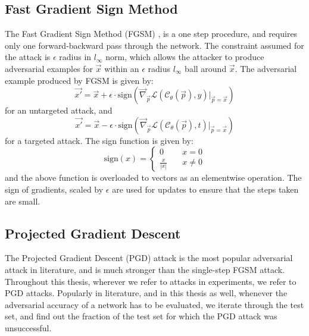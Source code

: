 \documentclass{ociamthesis}
\begin{document}
\subsection{Fast Gradient Sign Method}
The Fast Gradient Sign Method (FGSM) \citep{Goodfellow2015ExplainingAH}, is a
one step procedure, and requires only one forward-backward pass through the
network. The constraint assumed for the attack is $\epsilon$ radius in
$l_\infty$ norm, which allows the attacker to produce adversarial examples for
$\vec{x}$ within an $\epsilon$ radius $l_\infty$ ball around $\vec{x}$. The
adversarial example produced by FGSM is given by:
\begin{equation*}
    \vec{x'}
    = \vec{x} + \epsilon \cdot
    \text{sign}(\vec{\nabla}_\vec{p} \mathcal{L}(\mathcal{C}_\theta (\vec{p}), y)
    \bigr \rvert_{\vec{p}=\vec{x}})
\end{equation*}
for an untargeted attack, and
\begin{equation*}
    \vec{x'}
    = \vec{x} - \epsilon \cdot
    \text{sign}(\vec{\nabla}_\vec{p} \mathcal{L}(\mathcal{C}_\theta (\vec{p}), t)
    \bigr \rvert_{\vec{p}=\vec{x}})
\end{equation*}
for a targeted attack. The sign function is given by:
\begin{equation*}
    \text{sign}(x) = 
    \left\{
        \begin{array}{ll}
            0 & \quad x = 0 \\
            \frac{x}{|x|} & \quad x \neq 0
        \end{array}
    \right.
\end{equation*}
and the above function is overloaded to vectors as an elementwise operation. The
sign of gradients, scaled by $\epsilon$ are used for updates to ensure that the
steps taken are small.


\subsection{Projected Gradient Descent}
The Projected Gradient Descent (PGD) \citep{madry2019deep} attack is the most
popular adversarial attack in literature, and is much stronger than the
single-step FGSM attack. Throughout this thesis, wherever we refer to attacks in
experiments, we refer to PGD attacks. Popularly in literature, and in this
thesis as well, whenever the adversarial accuracy of a network has to be
evaluated, we iterate through the test set, and find out the fraction of the
test set for which the PGD attack was unsuccessful.
\end{document}
